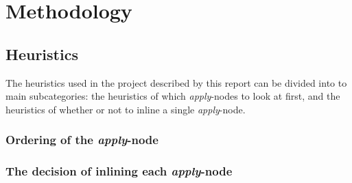 
\clearpage
\section{Methodology}


\subsection{Heuristics}

The heuristics used in the project described by this report can be divided into
to main subcategories: the heuristics of which \textit{apply}-nodes to look at
first, and the heuristics of whether or not to inline a single
\textit{apply}-node.

\subsubsection{Ordering of the \textit{apply}-node}

\subsubsection{The decision of inlining each \textit{apply}-node}
